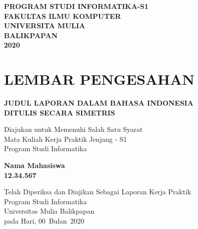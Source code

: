 \documentclass[oneside,listof=totoc]{scrbook}
\newcommand{\JudulLaporanKP}{JUDUL LAPORAN DALAM BAHASA INDONESIA \\ DITULIS SECARA SIMETRIS}
\newcommand{\NamaMahasiswa}{Nama Mahasiswa}
\newcommand{\NIM}{12.34.567}
\newcommand{\HariPembuatan}{Hari}
\newcommand{\TanggalPembuatan}{00}
\newcommand{\BulanPembuatan}{Bulan}
\newcommand{\TahunPembuatan}{2020}
\begin{document}
\vspace{2.0cm}

\begin{center}
  \normalsize{\textbf{PROGRAM STUDI INFORMATIKA-S1}}\\
  \normalsize{\textbf{FAKULTAS ILMU KOMPUTER}}\\
  \normalsize{\textbf{UNIVERSITA MULIA}}\\
  \normalsize{\textbf{BALIKPAPAN}}\\
  \normalsize{\textbf{\TahunPembuatan}}
\end{center}

\chapter{LEMBAR PENGESAHAN}

\vspace{0.5cm}

\begin{center}
  \normalsize{\textbf{\JudulLaporanKP}}
\end{center}

\vspace{0.1cm}

\begin{center}
  \linespread{1.0}
  \normalsize{Diajukan untuk Memenuhi Salah Satu Syarat\\
  Mata Kuliah Kerja Praktik Jenjang - S1\\
  Program Studi Informatika}
\end{center}

\vspace{1.5cm}

\begin{center}
  \textbf{\NamaMahasiswa}\\
  \textbf{\NIM}
\end{center}

\vspace{0.5cm}

\begin{center}
  \linespread{1.0}
  \normalsize{Telah Diperiksa dan Diujikan Sebagai Laporan Kerja Praktik\\
  Program Studi Informatika\\
  Universitas Mulia Balikpapan\\
  pada \HariPembuatan, \TanggalPembuatan\ \BulanPembuatan\ \TahunPembuatan}
\end{center}

\vspace{1.5cm}
\end{document}
